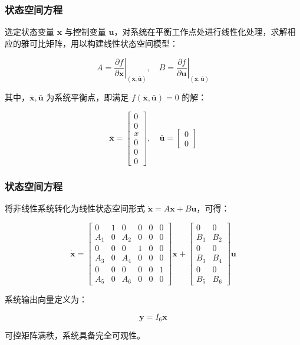 \documentclass{beamer}
\begin{document}
	
	\begin{frame}
	\frametitle{状态空间方程}

		
		选定状态变量 $\mathbf{x}$ 与控制变量 $\mathbf{u}$，对系统在平衡工作点处进行线性化处理，求解相应的雅可比矩阵，用以构建线性状态空间模型：
		
		\[
		A = \left. \frac{\partial f}{\partial \mathbf{x}} \right|_{(\bar{\mathbf{x}}, \bar{\mathbf{u}})}, \quad
		B = \left. \frac{\partial f}{\partial \mathbf{u}} \right|_{(\bar{\mathbf{x}}, \bar{\mathbf{u}})}
		\]
		
		其中，$\bar{\mathbf{x}}, \bar{\mathbf{u}}$ 为系统平衡点，即满足 $f(\bar{\mathbf{x}}, \bar{\mathbf{u}}) = 0$ 的解：
		
		\[
		\bar{\mathbf{x}} = \begin{bmatrix}
			0 \\
			0 \\
			x \\
			0 \\
			0 \\
			0
		\end{bmatrix}, \quad
		\bar{\mathbf{u}} = \begin{bmatrix}
			0 \\
			0
		\end{bmatrix}
		\]
		
	\end{frame}
	
	\begin{frame}
		\frametitle{状态空间方程}
		将非线性系统转化为线性状态空间形式 $\dot{\mathbf{x}} = A\mathbf{x} + B\mathbf{u}$，可得：
		
		\[
		\dot{\mathbf{x}} =
		\begin{bmatrix}
			0 & 1 & 0 & 0 & 0 & 0 \\
			A_1 & 0 & A_2 & 0 & 0 & 0 \\
			0 & 0 & 0 & 1 & 0 & 0 \\
			A_3 & 0 & A_4 & 0 & 0 & 0 \\
			0 & 0 & 0 & 0 & 0 & 1 \\
			A_5 & 0 & A_6 & 0 & 0 & 0
		\end{bmatrix}
		\mathbf{x} +
		\begin{bmatrix}
			0 & 0 \\
			B_1 & B_2 \\
			0 & 0 \\
			B_3 & B_4 \\
			0 & 0 \\
			B_5 & B_6
		\end{bmatrix}
		\mathbf{u}
		\tag{3-5}
		\]
		
		系统输出向量定义为：
		
		\[
		\mathbf{y} = I_6 \mathbf{x} \tag{3-6}
		\]
		
		可控矩阵满秩，系统具备完全可观性。
		

	\end{frame}
\end{document}
